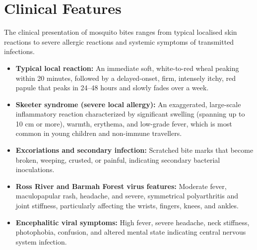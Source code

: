 \section*{Clinical Features}
The clinical presentation of mosquito bites ranges from typical localised skin reactions to severe allergic reactions and systemic symptoms of transmitted infections.
\begin{itemize}
    \item \textbf{Typical local reaction:} An immediate soft, white-to-red wheal peaking within 20 minutes, followed by a delayed-onset, firm, intensely itchy, red papule that peaks in 24--48 hours and slowly fades over a week.
    \item \textbf{Skeeter syndrome (severe local allergy):} An exaggerated, large-scale inflammatory reaction characterized by significant swelling (spanning up to 10 cm or more), warmth, erythema, and low-grade fever, which is most common in young children and non-immune travellers.
    \item \textbf{Excoriations and secondary infection:} Scratched bite marks that become broken, weeping, crusted, or painful, indicating secondary bacterial inoculations.
    \item \textbf{Ross River and Barmah Forest virus features:} Moderate fever, maculopapular rash, headache, and severe, symmetrical polyarthritis and joint stiffness, particularly affecting the wrists, fingers, knees, and ankles.
    \item \textbf{Encephalitic viral symptoms:} High fever, severe headache, neck stiffness, photophobia, confusion, and altered mental state indicating central nervous system infection.
\end{itemize}

